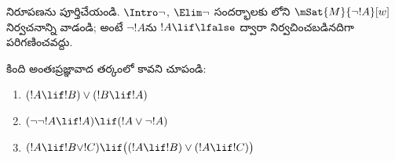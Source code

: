 \documentclass[../../../include/open-logic-section]{subfiles}
\begin{document}
\begin{prob}
   నిరూపణను
  పూర్తిచేయండి. $\Intro\lnot$, $\Elim\lnot$
  సందర్భాలకు లోని
  $\mSat{M}{\lnot !A}[w]$ నిర్వచనాన్ని వాడండి;
  అంటే $\lnot !A$ను $!A \lif \lfalse$ ద్వారా
  నిర్వచించబడినదిగా పరిగణించవద్దు.
\end{prob}

\begin{prob}
  కింది 
  అంతఃప్రజ్ఞావాద తర్కంలో
   కావని చూపండి:
  \begin{enumerate}
    \item $(!A \lif !B) \lor (!B \lif !A)$
    \item $(\lnot\lnot !A \lif !A) \lif (!A \lor \lnot !A)$
    \item $(!A \lif !B \lor !C) \lif \bigl((!A \lif !B)\lor(!A \lif !C)\bigr)$
  \end{enumerate}
\end{prob}
\end{document}
